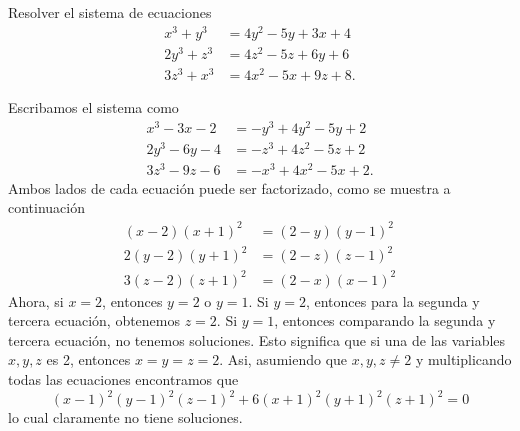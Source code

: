 \begin{example}
    Resolver el sistema de ecuaciones
    \begin{align*}
        x^3 + y^3  &= 4y^2 - 5y + 3x + 4\\
        2y^3 + z^3 &= 4z^2 - 5z + 6y + 6\\
        3z^3 + x^3 &= 4x^2 - 5x + 9z + 8.
    \end{align*}
\end{example}
\begin{solution}
    Escribamos el sistema como
    \begin{align*}
         x^3 - 3x - 2 &= -y^3 + 4y^2 - 5y + 2\\
        2y^3 - 6y - 4 &= -z^3 + 4z^2 - 5z + 2\\
        3z^3 - 9z - 6 &= -x^3 + 4x^2 - 5x + 2.
    \end{align*}
    Ambos lados de cada ecuación puede ser factorizado, como se muestra a continuación
    \begin{align*}
         (x - 2)(x + 1)^2 &= (2 - y)(y - 1)^2\\
        2(y - 2)(y + 1)^2 &= (2 - z)(z - 1)^2\\
        3(z - 2)(z + 1)^2 &= (2 - x)(x - 1)^2
    \end{align*}
    Ahora, si $x = 2$, entonces $y = 2$ o $y = 1$.
    Si $y = 2$, entonces para la segunda y tercera ecuación, obtenemos $z = 2$.
    Si $y = 1$, entonces comparando la segunda y tercera ecuación, no tenemos soluciones.
    Esto significa que si una de las variables $x, y, z$ es 2, entonces $x = y = z = 2$.
    Asi, asumiendo que $x,y, z \neq 2$ y multiplicando todas las ecuaciones encontramos que
    \[
        (x - 1)^2 (y - 1)^2 (z - 1)^2 + 6(x + 1)^2 (y + 1)^2 (z + 1)^2 = 0
    \]
    lo cual claramente no tiene soluciones.
\end{solution}

